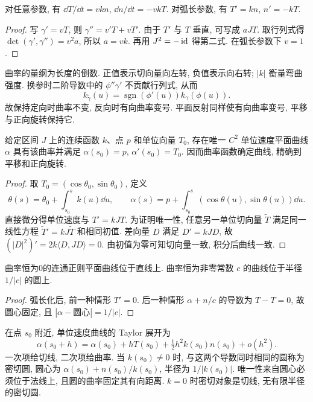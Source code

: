 \begin{proposition}\label{prop:plane-frenet}
对任意参数, 有 $\dd T/\dd t=v k n$, $\dd n/\dd t=-v k T$. 对弧长参数, 有 $T'=k n$, $n'=-kT$.
\end{proposition}
\begin{proof}
写 $\gamma'=vT$, 则 $\gamma''=v'T+vT'$. 由于 $T'$ 与 $T$ 垂直, 可写成 $aJT$. 取行列式得 $\det(\gamma',\gamma'')=v^2a$, 所以 $a=vk$. 再用 $J^2=-\operatorname{id}$ 得第二式. 在弧长参数下 $v=1$.
\end{proof}
曲率的量纲为长度的倒数. 正值表示切向量向左转, 负值表示向右转; $|k|$ 衡量弯曲强度. 换参时二阶导数中的 $\phi''\gamma'$ 不贡献行列式, 从而
\[
 k_{\widetilde\gamma}(u)=\operatorname{sgn}(\phi'(u))k_\gamma(\phi(u)).
\]
故保持定向时曲率不变, 反向时有向曲率变号. 平面反射同样使有向曲率变号, 平移与正向旋转保持它.
\begin{theorem}\label{thm:plane-fundamental}
给定区间 $J$ 上的连续函数 $k$、点 $p$ 和单位向量 $T_0$, 存在唯一 $C^2$ 单位速度平面曲线 $\alpha$ 具有该曲率并满足 $\alpha(s_0)=p$, $\alpha'(s_0)=T_0$. 因而曲率函数确定曲线, 精确到平移和正向旋转.
\end{theorem}
\begin{proof}
取 $T_0=(\cos\theta_0,\sin\theta_0)$, 定义
\[
 \theta(s)=\theta_0+\int_{s_0}^s k(u)\dd u,\qquad
 \alpha(s)=p+\int_{s_0}^s(\cos\theta(u),\sin\theta(u))\dd u.
\]
直接微分得单位速度与 $T'=kJT$. 为证明唯一性, 任意另一单位切向量 $\widetilde T$ 满足同一线性方程 $\widetilde T'=kJ\widetilde T$ 和相同初值. 差向量 $D$ 满足 $D'=kJD$, 故 $(|D|^2)'=2k\langle D,JD\rangle=0$. 由初值为零可知切向量一致, 积分后曲线一致.
\end{proof}
\begin{corollary}
曲率恒为0的连通正则平面曲线位于直线上. 曲率恒为非零常数 $c$ 的曲线位于半径 $1/|c|$ 的圆上.
\end{corollary}
\begin{proof}
弧长化后, 前一种情形 $T'=0$. 后一种情形 $\alpha+n/c$ 的导数为 $T-T=0$, 故圆心固定, 且 $|\alpha-\text{圆心}|=1/|c|$.
\end{proof}
在点 $s_0$ 附近, 单位速度曲线的 Taylor 展开为
\[
\alpha(s_0+h)=\alpha(s_0)+hT(s_0)+\tfrac12h^2 k(s_0)n(s_0)+o(h^2).
\]
一次项给切线, 二次项给曲率. 当 $k(s_0)\ne0$ 时, 与这两个导数同时相同的圆称为密切圆, 圆心为 $\alpha(s_0)+n(s_0)/k(s_0)$, 半径为 $1/|k(s_0)|$. 唯一性来自圆心必须位于法线上, 且圆的曲率固定其有向距离. $k=0$ 时密切对象是切线, 无有限半径的密切圆.
\begin{center}
\end{center}
